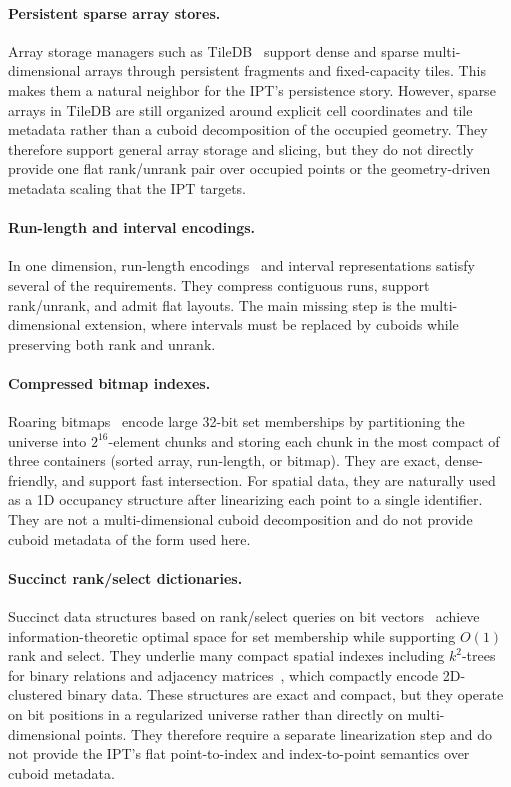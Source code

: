 \documentclass[manuscript,screen,review]{acmart}
\theoremstyle{definition}
\theoremstyle{plain}
\begin{document}
\paragraph{Persistent sparse array stores.}
Array storage managers such as
TileDB~\cite{PapadopoulosDattaMaddenMattson2016} support dense and
sparse multi-dimensional arrays through persistent fragments and
fixed-capacity tiles. This makes them a natural neighbor for the
IPT's persistence story. However, sparse arrays in TileDB are still
organized around explicit cell coordinates and tile metadata rather
than a cuboid decomposition of the occupied geometry. They therefore
support general array storage and slicing, but they do not directly
provide one flat rank/unrank pair over occupied points or the
geometry-driven metadata scaling that the IPT targets.

\paragraph{Run-length and interval encodings.}
In one dimension, run-length encodings~\cite{Golomb1966} and interval
representations satisfy several of the requirements. They compress
contiguous runs, support rank/unrank, and admit flat layouts. The main
missing step is the multi-dimensional extension, where intervals must
be replaced by cuboids while preserving both rank and unrank.

\paragraph{Compressed bitmap indexes.}
Roaring bitmaps~\cite{ChambiLemireKaserGodin2016,LemireSsiYanKaiKaser2016}
encode large 32-bit set memberships by partitioning the universe into
$2^{16}$-element chunks and storing each chunk in the most compact of
three containers (sorted array, run-length, or bitmap). They are exact,
dense-friendly, and support fast intersection. For spatial data, they
are naturally used as a 1D occupancy structure after linearizing each
point to a single identifier. They are not a multi-dimensional cuboid
decomposition and do not provide cuboid metadata of the form used here.

\paragraph{Succinct rank/select dictionaries.}
Succinct data structures based on rank/select queries on bit
vectors~\cite{Jacobson1989,RamanRamanRao2007} achieve
information-theoretic optimal space for set membership while
supporting $O(1)$ rank and select. They underlie many compact spatial
indexes including $k^2$-trees for binary relations and adjacency
matrices~\cite{BrisaboaLadraNavarro2014}, which compactly encode
2D-clustered binary data. These structures are exact and compact, but
they operate on bit positions in a regularized universe rather than
directly on multi-dimensional points. They therefore require a
separate linearization step and do not provide the IPT's flat
point-to-index and index-to-point semantics over cuboid metadata.
\end{document}
